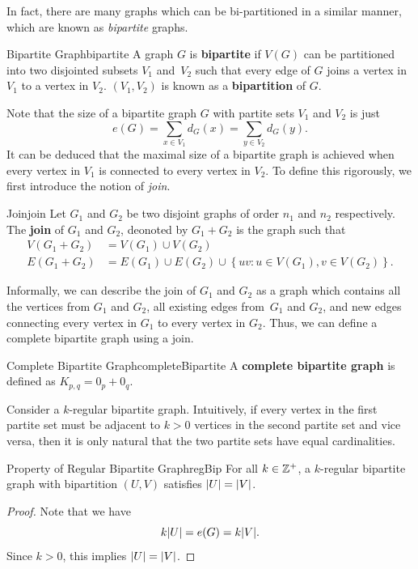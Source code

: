 \documentclass[math]{amznotes}
\theoremstyle{remark}
\begin{document}
In fact, there are many graphs which can be bi-partitioned in a similar manner, which are known as \textit{bipartite} graphs.
\begin{dfnbox}{Bipartite Graph}{bipartite}
    A graph $G$ is {\color{red} \textbf{bipartite}} if $V(G)$ can be partitioned into two disjointed subsets $V_1$ and~$V_2$ such that every edge of $G$ joins a vertex in $V_1$ to a vertex in $V_2$. $(V_1, V_2)$ is known as a {\color{red} \textbf{bipartition}} of $G$.
\end{dfnbox}
Note that the size of a bipartite graph $G$ with partite sets $V_1$ and $V_2$ is just
\begin{equation*}
    e(G) = \sum_{x \in V_1}d_G(x) = \sum_{y \in V_2}d_G(y).
\end{equation*}
It can be deduced that the maximal size of a bipartite graph is achieved when every vertex in $V_1$ is connected to every vertex in $V_2$. To define this rigorously, we first introduce the notion of \textit{join}.
\begin{dfnbox}{Join}{join}
    Let $G_1$ and $G_2$ be two disjoint graphs of order $n_1$ and $n_2$ respectively. The {\color{red} \textbf{join}} of $G_1$ and $G_2$, deonoted by $G_1 + G_2$ is the graph such that
    \begin{align*}
        V(G_1 + G_2) & = V(G_1) \cup V(G_2) \\
        E(G_1 + G_2) & = E(G_1) \cup E(G_2) \cup \left\{uv \colon u \in V(G_1), v \in V(G_2)\right\}.
    \end{align*}
\end{dfnbox}
Informally, we can describe the join of $G_1$ and $G_2$ as a graph which contains all the vertices from $G_1$ and $G_2$, all existing edges from~$G_1$ and $G_2$, and new edges connecting every vertex in $G_1$ to every vertex in $G_2$. Thus, we can define a complete bipartite graph using a join.
\begin{dfnbox}{Complete Bipartite Graph}{completeBipartite}
    A {\color{red} \textbf{complete bipartite graph}} is defined as $K_{p, q} = 0_p + 0_q$.
\end{dfnbox}
Consider a $k$-regular bipartite graph. Intuitively, if every vertex in the first partite set must be adjacent to $k > 0$ vertices in the second partite set and vice versa, then it is only natural that the two partite sets have equal cardinalities.
\begin{probox}{Property of Regular Bipartite Graph}{regBip}
    For all $k \in \mathbb{Z}^+$, a $k$-regular bipartite graph with bipartition $(U, V)$ satisfies ${\left\lvert {U} \right\rvert} = {\left\lvert {V} \right\rvert}$.
    \tcblower
    \begin{proof}
        Note that we have
        \begin{equation*}
            k{\left\lvert {U} \right\rvert} = e(G) = k{\left\lvert {V} \right\rvert}.
        \end{equation*}
        Since $k > 0$, this implies ${\left\lvert {U} \right\rvert} = {\left\lvert {V} \right\rvert}$.
    \end{proof}
\end{probox}
\end{document}

